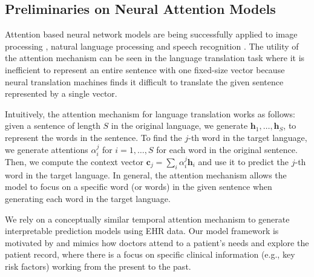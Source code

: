 \subsection{Preliminaries on Neural Attention Models}
\label{sec:attention}
Attention based neural network models are being successfully applied to image processing \cite{ba2014multiple,mnih2014recurrent,gregor2015draw,xu2015show}, natural language processing \cite{bahdanau2014neural,hermann2015teaching,rush2015neural} and speech recognition \cite{chorowski2015attention}. The utility of the attention mechanism can be seen in the language translation task \cite{bahdanau2014neural} where it is inefficient to represent an entire sentence with one fixed-size vector because neural translation machines finds it difficult to translate the given sentence represented by a single vector. 

Intuitively, the attention mechanism for language translation works as follows: given a sentence of length $S$ in the original language, we generate $\mathbf{h}_1, \ldots, \mathbf{h}_{S}$, to represent the words in the sentence. To find the $j$-th word in the target language, we generate attentions $\alpha_i^j$ for $i=1, \ldots, S$ for each word in the original sentence. Then, we compute the context vector $\mathbf{c}_j = \sum_{i}\alpha_i^j\mathbf{h}_i$ and use it to predict the $j$-th word in the target language.  In general, the attention mechanism allows the model to focus on a specific word (or words) in the given sentence when generating each word in the target language. 

We rely on a conceptually similar temporal attention mechanism to generate interpretable prediction models using EHR data. Our model framework is motivated by and mimics how doctors attend to a patient’s needs and explore the patient record, where there is a focus on specific clinical information (e.g., key risk factors) working from the present to the past.


%
  
